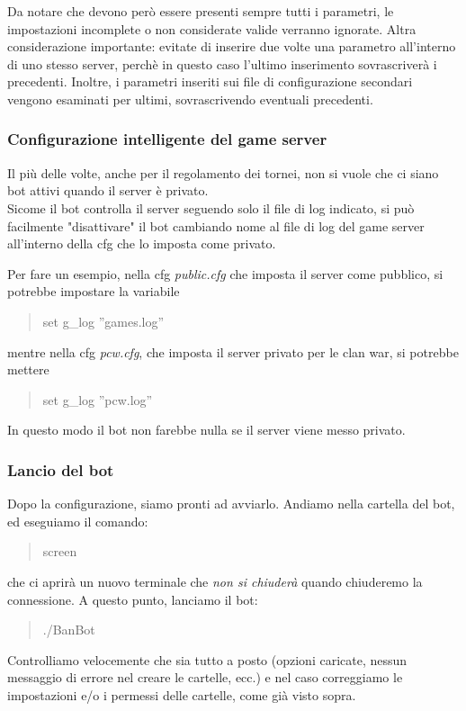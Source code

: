 \documentclass[a4paper]{article}
\begin{document}
Da notare che devono per\`o essere presenti sempre tutti i parametri, le impostazioni incomplete o non considerate valide verranno ignorate.
Altra considerazione importante: evitate di inserire due volte una parametro all'interno di uno stesso server, perch\`e in questo caso l'ultimo inserimento sovrascriver\`a i precedenti. Inoltre, i parametri inseriti sui file di configurazione secondari vengono esaminati per ultimi, sovrascrivendo eventuali precedenti.

\subsubsection{Configurazione intelligente del game server}
Il pi\`u delle volte, anche per il regolamento dei tornei, non si vuole che ci siano bot attivi quando il server \`e privato.\\
Sicome il bot controlla il server seguendo solo il file di log indicato, si pu\`o facilmente "disattivare" il bot cambiando nome al file di log del game server all'interno della cfg che lo imposta come privato.

Per fare un esempio, nella cfg \textit{public.cfg} che imposta il server come pubblico, si potrebbe impostare la variabile
\begin{quote}
set g\_log ''games.log''
\end{quote}
mentre nella cfg \textit{pcw.cfg}, che imposta il server privato per le clan war, si potrebbe mettere
\begin{quote}
set g\_log ''pcw.log''
\end{quote}

In questo modo il bot non farebbe nulla se il server viene messo privato.

\subsubsection{Lancio del bot}
Dopo la configurazione, siamo pronti ad avviarlo.
Andiamo nella cartella del bot, ed eseguiamo il comando:
\begin{quote}
screen
\end{quote}
che ci aprir\`a un nuovo terminale che \textit{non si chiuder\`a} quando chiuderemo la connessione.
A questo punto, lanciamo il bot:
\begin{quote}
./BanBot
\end{quote}
Controlliamo velocemente che sia tutto a posto (opzioni caricate, nessun messaggio di errore nel creare le cartelle, ecc.) e nel caso correggiamo le impostazioni e/o i permessi delle cartelle, come gi\`a visto sopra.\\
\end{document}
